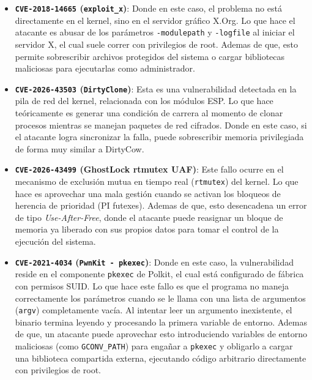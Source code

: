 \documentclass[letterpaper,11pt]{article}
\begin{document}
\begin{itemize}
  \textbf{Link:} \url{https://github.com/JlSakuya/Linux-Privilege-Escalation-Exploits/tree/main/2021/CVE-2021-22555}

  \item \textbf{\texttt{CVE-2018-14665} (\texttt{exploit\_x})}: Donde en este caso, el problema no está directamente en el kernel, sino en el servidor gráfico X.Org. Lo que hace el atacante es abusar de los parámetros \texttt{-modulepath} y \texttt{-logfile} al iniciar el servidor X, el cual suele correr con privilegios de root. Ademas de que, esto permite sobrescribir archivos protegidos del sistema o cargar bibliotecas maliciosas para ejecutarlas como administrador.

  \item \textbf{\texttt{CVE-2026-43503} (\texttt{DirtyClone})}: Esta es una vulnerabilidad detectada en la pila de red del kernel, relacionada con los módulos ESP. Lo que hace teóricamente es generar una condición de carrera al momento de clonar procesos mientras se manejan paquetes de red cifrados. Donde en este caso, si el atacante logra sincronizar la falla, puede sobrescribir memoria privilegiada de forma muy similar a DirtyCow.

  \item \textbf{\texttt{CVE-2026-43499} (GhostLock rtmutex UAF)}: Este fallo ocurre en el mecanismo de exclusión mutua en tiempo real (\texttt{rtmutex}) del kernel. Lo que hace es aprovechar una mala gestión cuando se activan los bloqueos de herencia de prioridad (PI futexes). Ademas de que, esto desencadena un error de tipo \textit{Use-After-Free}, donde el atacante puede reasignar un bloque de memoria ya liberado con sus propios datos para tomar el control de la ejecución del sistema.
  
  \item \textbf{\texttt{CVE-2021-4034} (\texttt{PwnKit - pkexec})}: Donde en este caso, la vulnerabilidad reside en el componente \texttt{pkexec} de Polkit, el cual está configurado de fábrica con permisos SUID. Lo que hace este fallo es que el programa no maneja correctamente los parámetros cuando se le llama con una lista de argumentos (\texttt{argv}) completamente vacía. Al intentar leer un argumento inexistente, el binario termina leyendo y procesando la primera variable de entorno. Ademas de que, un atacante puede aprovechar esto introduciendo variables de entorno maliciosas (como \texttt{GCONV\_PATH}) para engañar a \texttt{pkexec} y obligarlo a cargar una biblioteca compartida externa, ejecutando código arbitrario directamente con privilegios de root.
  

\end{itemize}
\end{document}
